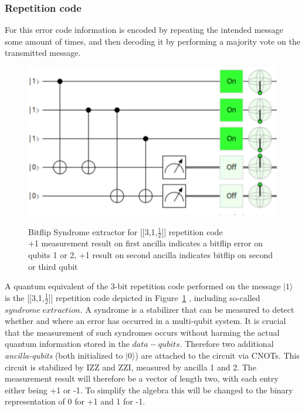 \subsubsection{Repetition code}
For this error code information is encoded by repeating the 
intended message some amount of times, and then decoding it
by performing a majority vote on the transmitted message.


\begin{figure}[h!]
	\begin{center}
	\captionsetup{justification=centering,margin=2cm}
	\includegraphics[scale=0.2]{./img/figures/bitflipSyndromeExtraction3Rep.png}\\
	\caption{Bitflip Syndrome extractor for [[3,1,$\frac{1}{2}$]] repetition code\\
        +1 measurement result on first ancilla indicates a bitflip error
        on qubits 1 or 2, +1 result on second ancilla indicates 
		bitflip on second or third qubit}
	\label{fig: syndrome extractor}
	\end{center}
\end{figure}

A quantum equivalent of the 3-bit repetition code performed on
the message $|1\rangle$ is the [[3,1,$\frac{1}{2}$]] repetition
code depicted in 
Figure~\ref{fig: syndrome extractor}
, including so-called
$syndrome\ extraction$. A syndrome is a stabilizer that can be
measured to detect whether and where an error has occurred
in a multi-qubit system. It is crucial that the 
measurement of such syndromes occurs without harming the actual
quantum information stored in the $data-qubits$. Therefore
two additional \emph{ancilla-qubits} (both initialized to 
$|0\rangle$) are attached to the circuit via CNOTs.
This circuit is stabilized by IZZ and ZZI, measured by ancilla 
1 and 2. The measurement result will therefore be a vector of length
two, with each entry either being +1 or -1. To simplify the 
algebra this will be changed to the binary representation of 0 
for +1 and 1 for -1. 

